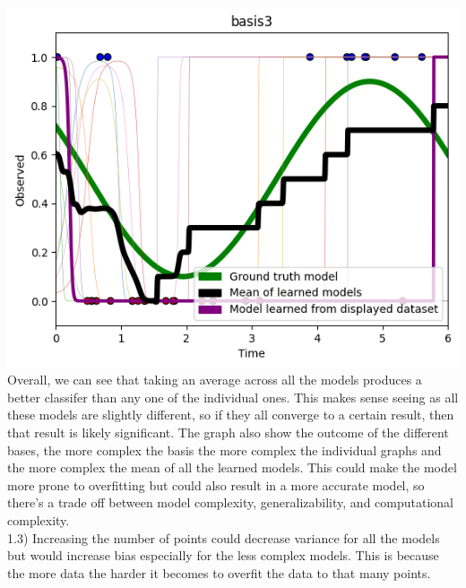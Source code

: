 \documentclass[submit]{harvardml}
\begin{document}
{\includegraphics[width=\textwidth]{images/graph3.png} \\
Overall, we can see that taking an average across all the models produces a better classifer than any one of the individual ones. This makes sense seeing as all these models are slightly different, so if they all converge to a certain result, then that result is likely significant. The graph also show the outcome of the different bases, the more complex the basis the more complex the individual graphs and the more complex the mean of all the learned models. This could make the model more prone to overfitting but could also result in a more accurate model, so there's a trade off between model complexity, generalizability, and computational complexity. \\
1.3) Increasing the number of points could decrease variance for all the models but would increase bias especially for the less complex models. This is because the more data the harder it becomes to overfit the data to that many points.}
\end{document}
